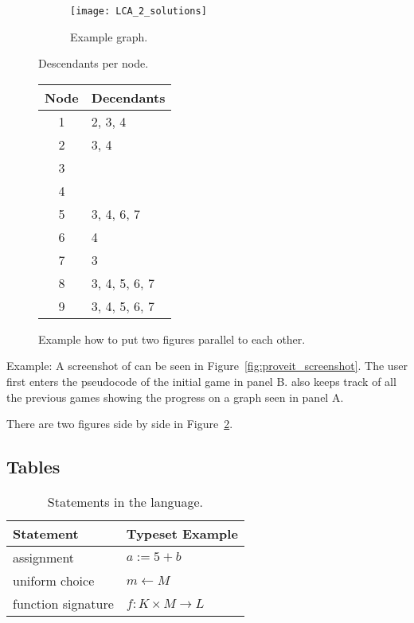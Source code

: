 \begin{figure} [htbp]
  \centering
\begin{subfigure}[c]{0.45\textwidth}
\texttt{[image: LCA\_2\_solutions]}
\caption{Example graph.}
\label{fig:graph}
\end{subfigure}
\hfil
\begin{subtable}[c]{0.3\textwidth}
\centering
\caption{Descendants per node.}
\begin{tabular}{cl}
  \toprule
	Node & Decendants \\
  \midrule
  1 & 2, 3, 4 \\
  2 & 3, 4 \\
  3 & \\
  4 & \\
  5 & 3, 4, 6, 7 \\
  6 & 4 \\
  7 & 3 \\
  8 & 3, 4, 5, 6, 7\\
  9 & 3, 4, 5, 6, 7\\
  \bottomrule
\end{tabular}
\end{subtable}
%
\caption{Example how to put two figures parallel to each other.}
\label{fig:LCA_2_solutions}
\end{figure}


Example: A screenshot of \proveit can be seen in Figure~\ref{fig:proveit_screenshot}. The user first enters the pseudocode of the initial game in panel B. \proveit also keeps track of all the previous games showing the progress on a graph seen in panel A.

There are two figures side by side in Figure~\ref{fig:LCA_2_solutions}.


\subsection{Tables}

\begin{table}[h]
\centering
\caption{Statements in the \proveit language.}
\begin{tabular}{ll}
	\toprule
	Statement & Typeset Example \\
	\midrule
	assignment & $a := 5 + b$ \\
	uniform choice & $m \gets M$ \\
	function signature & $f : K \times M \to L$ \\
	\bottomrule
\end{tabular}
\label{tab:statements}
\end{table}


